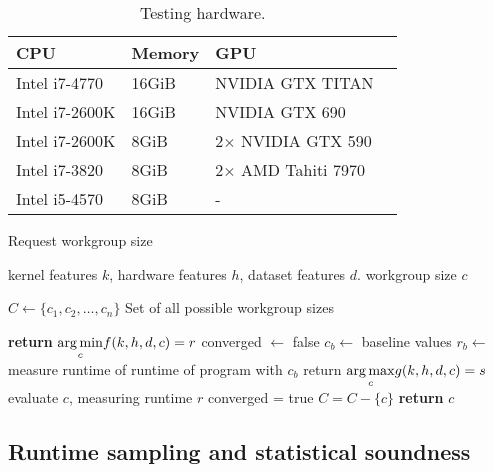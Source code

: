 \begin{table}
\footnotesize
\centering
\begin{tabular}{| l | l | l | l |}
\hline
\textbf{CPU} & \textbf{Memory} & \textbf{GPU}\\
\hline
Intel i7-4770 & 16GiB & NVIDIA GTX TITAN\\
Intel i7-2600K & 16GiB & NVIDIA GTX 690\\
Intel i7-2600K & 8GiB & 2$\times$ NVIDIA GTX 590\\
Intel i7-3820 & 8GiB & 2$\times$ AMD Tahiti 7970\\
Intel i5-4570 & 8GiB & -\\
\hline
\end{tabular}
\caption{Testing hardware.}
\label{tab:hw}
\end{table}


\newpage

\begin{algorithm}
\caption{Request workgroup size}\label{bar}
\begin{algorithmic}[1]
\Require kernel features $k$, hardware features $h$, dataset features $d$.
\Ensure workgroup size $c$

\State $C \leftarrow \{ c_1, c_2,\ldots, c_n \}$
\Comment Set of all possible workgroup sizes

    \State \textbf{return} $\underset{c}{\operatorname*{arg\,min}} f(k,h,d,c) = r$
\Else
   \State converged $\leftarrow$ false
   \State $c_b \leftarrow$ baseline values
   \State $r_b \leftarrow$ measure runtime of runtime of program with $c_b$
     \State return $\underset{c}{\operatorname*{arg\,max}} g(k,h,d,c) = s$
     \State evaluate $c$, measuring runtime $r$\;
       \State converged = true
     \Else
       \State $C = C - \{c\}$
     \EndIf
   \EndWhile
   \State \textbf{return} $c$
\EndIf
\end{algorithmic}
\end{algorithm}


\subsection{Runtime sampling and statistical soundness}


